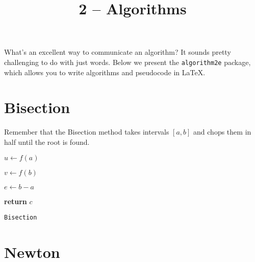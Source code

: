 \documentclass{article}
\title{2 -- Algorithms}
\begin{document}
\maketitle

What's an excellent way to communicate an algorithm? It sounds
pretty challenging to do with just words. Below we present the
\texttt{algorithm2e} package, which allows you to write algorithms
and pseudocode in LaTeX.

\section{Bisection}

Remember that the Bisection method takes intervals $[a, b]$ and
chops them in half until the root is found.

\begin{center}
	\begin{minipage}{0.5\linewidth} %
		\begin{algorithm}[H]

      $u \gets f(a)$

      $v \gets f(b)$

      $e \gets b - a$


			{\bf return} $c$
			\caption{\texttt{Bisection}} %
			\label{alg:bisection}   %
		\end{algorithm}
	\end{minipage}
\end{center}

\section{Newton}
\end{document}
